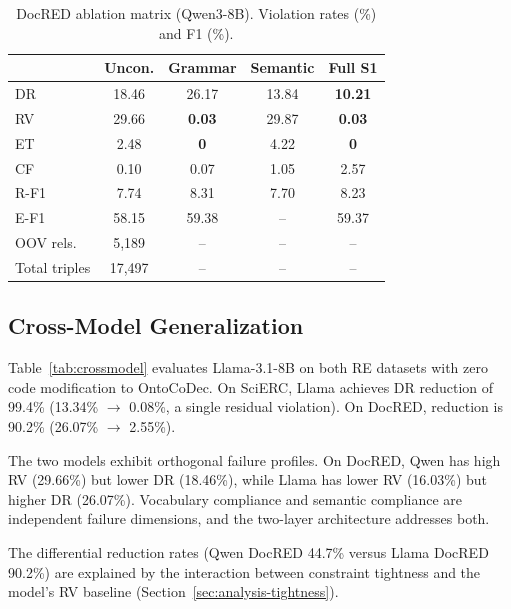 \documentclass[11pt,a4paper]{article}
\newcommand{\ours}{OntoCoDec}
\newcommand{\drsym}{\textsc{DR}}
\newcommand{\rvsym}{\textsc{RV}}
\newcommand{\etsym}{\textsc{ET}}
\newcommand{\cfsym}{\textsc{CF}}
\begin{document}
\begin{table}[t]
\centering
\caption{DocRED ablation matrix (Qwen3-8B). Violation rates (\%) and F1 (\%).}
\label{tab:docred-ablation}
\small
\begin{tabular}{lcccc}
\toprule
& \textbf{Uncon.} & \textbf{Grammar} & \textbf{Semantic} & \textbf{Full S1} \\
\midrule
\drsym{} & 18.46 & 26.17 & 13.84 & \textbf{10.21} \\
\rvsym{} & 29.66 & \textbf{0.03} & 29.87 & \textbf{0.03} \\
\etsym{} & 2.48 & \textbf{0} & 4.22 & \textbf{0} \\
\cfsym{} & 0.10 & 0.07 & 1.05 & 2.57 \\
\midrule
R-F1 & 7.74 & 8.31 & 7.70 & 8.23 \\
E-F1 & 58.15 & 59.38 & -- & 59.37 \\
\midrule
OOV rels. & 5,189 & -- & -- & -- \\
Total triples & 17,497 & -- & -- & -- \\
\bottomrule
\end{tabular}
\end{table}

\subsection{Cross-Model Generalization}
\label{sec:crossmodel}

Table~\ref{tab:crossmodel} evaluates Llama-3.1-8B on both RE datasets with zero code modification to \ours{}. On SciERC, Llama achieves \drsym{} reduction of 99.4\% (13.34\% $\to$ 0.08\%, a single residual violation). On DocRED, reduction is 90.2\% (26.07\% $\to$ 2.55\%).

The two models exhibit orthogonal failure profiles. On DocRED, Qwen has high \rvsym{} (29.66\%) but lower \drsym{} (18.46\%), while Llama has lower \rvsym{} (16.03\%) but higher \drsym{} (26.07\%). Vocabulary compliance and semantic compliance are independent failure dimensions, and the two-layer architecture addresses both.

The differential reduction rates (Qwen DocRED 44.7\% versus Llama DocRED 90.2\%) are explained by the interaction between constraint tightness and the model's \rvsym{} baseline (Section~\ref{sec:analysis-tightness}).
\end{document}
